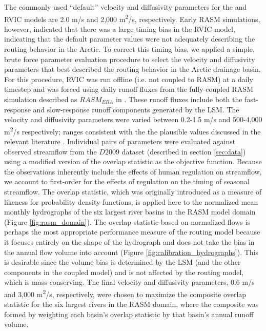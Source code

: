 \documentclass[jgrga, draft]{agutex}
\begin{document}
\begin{article}
The commonly used ``default'' velocity and diffusivity parameters for the \citet{Lohmann_1996} and RVIC models are 2.0 m/s and 2,000 m\textsuperscript{2}/s, respectively.
Early RASM simulations, however, indicated that there was a large timing bias in the RVIC model, indicating that the default parameter values were not adequately describing the routing behavior in the Arctic.
To correct this timing bias, we applied a simple, brute force parameter evaluation procedure to select the velocity and diffusivity parameters that best described the routing behavior in the Arctic drainage basin.
For this procedure, RVIC was run offline (i.e. not coupled to RASM) at a daily timestep and was forced using daily runoff fluxes from the fully-coupled RASM simulation described as $RASM_{ERA}$ in \citet{Hamman_2016}.
These runoff fluxes include both the fast-response and slow-response runoff components generated by the LSM.
The velocity and diffusivity parameters were varied between 0.2-1.5 m/s and 500-4,000 m\textsuperscript{2}/s respectively; ranges consistent with the the plausible values discussed in the relevant literature \citep[e.g.][]{Decharme_2010,Lohmann_1996}.
Individual pairs of parameters were evaluated against observed streamflow from the $D2009$ dataset (described in section \ref{sec:data}) using a modified version of the overlap statistic \citep{Perkins_2007} as the objective function.
Because the observations inherently include the effects of human regulation on streamflow, we account to first-order for the effects of regulation on the timing of seasonal streamflow.
The overlap statistic, which was originally introduced as a measure of likeness for probability density functions, is applied here to the normalized mean monthly hydrographs of the six largest river basins in the RASM model domain (Figure \ref{fig:rasm_domain}).
The overlap statistic based on normalized flows is perhaps the most appropriate performance measure of the routing model because it focuses entirely on the shape of the hydrograph and does not take the bias in the annual flow volume into account (Figure \ref{fig:calibration_hydrographs}).
This is desirable since the volume bias is determined by the LSM (and the other components in the coupled model) and is not affected by the routing model, which is mass-conserving.
The final velocity and diffusivity parameters, 0.6 m/s and 3,000 m\textsuperscript{2}/s, respectively, were chosen to maximize the composite overlap statistic for the six largest rivers in the RASM domain, where the composite was formed by weighting each basin's overlap statistic by that basin's annual runoff volume.


\end{article}
\end{document}
